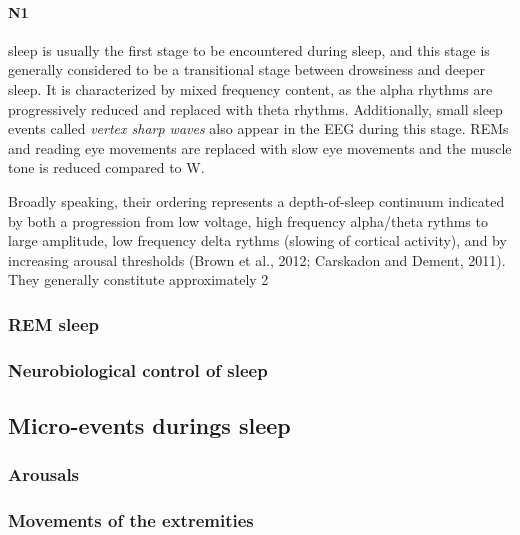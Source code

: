             \paragraph{N1} sleep is usually the first stage to be encountered during sleep, and this stage is generally considered to be a transitional stage between drowsiness and deeper sleep.
            It is characterized by mixed frequency content, as the alpha rhythms are progressively reduced and replaced with theta rhythms.
            Additionally, small sleep events called \textit{vertex sharp waves} also appear in the \ac{EEG} during this stage.
            \Acp{REM} and reading eye movements are replaced with slow eye movements and the muscle tone is reduced compared to \ac{W}.
            
            
            Broadly speaking, their ordering represents a depth-of-sleep continuum indicated by both a progression from low voltage, high frequency alpha/theta rythms to large amplitude, low frequency delta rythms (slowing of cortical activity), and by increasing arousal thresholds (Brown et al., 2012; Carskadon and Dement, 2011). They generally constitute approximately 2 %
            
            \subsubsection{REM sleep}
            
                \cite{Foulkes1962, Ermis2010, Sato1997, Hobson2009}
                
            \subsubsection{Neurobiological control of sleep}\label{sec:control-sleep}
        \subsection{Micro-events durings sleep}
            \subsubsection{Arousals}
                \citep{Ermis2010}
            \subsubsection{Movements of the extremities}
